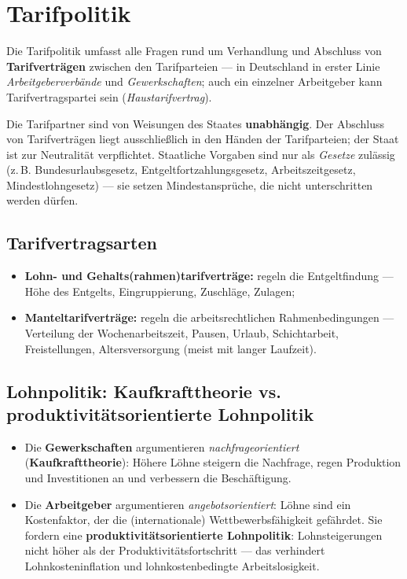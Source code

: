 \documentclass[11pt, a4paper]{article}
\begin{document}
\section{Tarifpolitik}

Die Tarifpolitik umfasst alle Fragen rund um Verhandlung und Abschluss von
\textbf{Tarifverträgen} zwischen den Tarifparteien --- in Deutschland in erster Linie
\emph{Arbeitgeberverbände} und \emph{Gewerkschaften}; auch ein einzelner Arbeitgeber kann
Tarifvertragspartei sein (\emph{Haustarifvertrag}).

\begin{merksatz}[title={\bfseries Tarifautonomie (Art. 9 Abs. 3 GG)}]
Die Tarifpartner sind von Weisungen des Staates \textbf{unabhängig}. Der Abschluss von
Tarifverträgen liegt ausschließlich in den Händen der Tarifparteien; der Staat ist zur
Neutralität verpflichtet. Staatliche Vorgaben sind nur als \emph{Gesetze} zulässig
(z.\,B. Bundesurlaubsgesetz, Entgeltfortzahlungsgesetz, Arbeitszeitgesetz,
Mindestlohngesetz) --- sie setzen Mindestansprüche, die nicht unterschritten werden dürfen.
\end{merksatz}

\subsection{Tarifvertragsarten}

\begin{itemize}
  \item \textbf{Lohn- und Gehalts(rahmen)tarifverträge:} regeln die Entgeltfindung ---
    Höhe des Entgelts, Eingruppierung, Zuschläge, Zulagen;
  \item \textbf{Manteltarifverträge:} regeln die arbeitsrechtlichen Rahmenbedingungen ---
    Verteilung der Wochenarbeitszeit, Pausen, Urlaub, Schichtarbeit, Freistellungen,
    Altersversorgung (meist mit langer Laufzeit).
\end{itemize}

\subsection{Lohnpolitik: Kaufkrafttheorie vs. produktivitätsorientierte Lohnpolitik}

\begin{itemize}
  \item Die \textbf{Gewerkschaften} argumentieren \emph{nachfrageorientiert}
    (\textbf{Kaufkrafttheorie}): Höhere Löhne steigern die Nachfrage, regen Produktion und
    Investitionen an und verbessern die Beschäftigung.
  \item Die \textbf{Arbeitgeber} argumentieren \emph{angebotsorientiert}: Löhne sind ein
    Kostenfaktor, der die (internationale) Wettbewerbsfähigkeit gefährdet. Sie fordern eine
    \textbf{produktivitätsorientierte Lohnpolitik}: Lohnsteigerungen nicht höher als der
    Produktivitätsfortschritt --- das verhindert Lohnkosteninflation und lohnkostenbedingte
    Arbeitslosigkeit.
\end{itemize}
\end{document}
